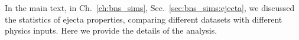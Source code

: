%

In the main text, in Ch.~\ref{ch:bns_sims}, Sec.~\ref{sec:bns_sims:ejecta}, 
we discussed the statistics of ejecta properties, comparing different 
datasets with different physics inputs. Here we provide the details of the analysis. 


